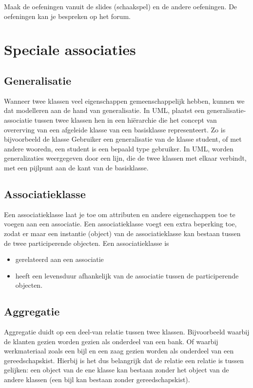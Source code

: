 \begin{exercise}
	Maak de oefeningen vanuit de slides (schaakspel) en de andere oefeningen. De oefeningen kan je bespreken op het forum.
\end{exercise}

\section{Speciale associaties}
\subsection{Generalisatie}
Wanneer twee klassen veel eigenschappen gemeenschappelijk hebben, kunnen we dat modelleren aan de hand van generalisatie. In UML, plaatst een generalisatie-associatie tussen twee klassen hen in een hi\"erarchie die het concept van overerving van een afgeleide klasse van een basisklasse representeert. Zo is bijvoorbeeld de klasse Gebruiker een generalisatie van de klasse student, of met andere wooredn, een student is een bepaald type gebruiker. In UML, worden generalizaties weergegeven door een lijn, die de twee klassen met elkaar verbindt, met een pijlpunt aan de kant van de basisklasse. 

\subsection{Associatieklasse}
Een associatieklasse laat je toe om attributen en andere eigenschappen
toe te voegen aan een associatie. Een associatieklasse voegt een extra beperking toe, 
zodat er maar een instantie (object) van de associatieklasse kan bestaan tussen de 
twee participerende objecten.  Een associatieklasse is 

\begin{itemize}
	\item gerelateerd aan een associatie
	\item heeft een levensduur  afhankelijk van de associatie tussen de participerende objecten.
\end{itemize}

\subsection{Aggregatie}
Aggregatie duidt op een deel-van relatie tussen twee klassen. Bijvoorbeeld waarbij de 
klanten gezien worden gezien als onderdeel van een bank. Of waarbij werkmateriaal zoals
een bijl en een zaag gezien worden als onderdeel van een gereedschapskist. Hierbij is het 
dus belangrijk dat de relatie een relatie is tussen gelijken: een object van de ene klasse
kan bestaan zonder het object van de andere klassen (een bijl kan bestaan zonder 
gereedschapskist).


